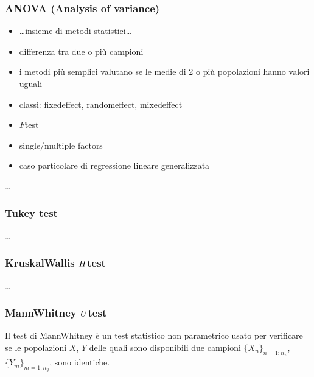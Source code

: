 \documentclass[letterpaper,10pt,italian]{jupyterBook}
\begin{document}
\subsubsection{ANOVA (Analysis of variance)}
\label{\detokenize{ch/statistics/hp-test-independence:anova-analysis-of-variance}}\begin{itemize}
\item {} 
\sphinxAtStartPar
…insieme di metodi statistici…

\item {} 
\sphinxAtStartPar
differenza tra due o più campioni

\item {} 
\sphinxAtStartPar
i metodi più semplici valutano se le medie di 2 o più popolazioni hanno valori uguali

\item {} 
 classi: fixed\sphinxhyphen{}effect, random\sphinxhyphen{}effect, mixed\sphinxhyphen{}effect

\item {} 
\sphinxAtStartPar
\(F\)\sphinxhyphen{}test

\item {} 
\sphinxAtStartPar
single/multiple factors

\item {} 
\sphinxAtStartPar
caso particolare di regressione lineare generalizzata

\end{itemize}

\sphinxAtStartPar
…


\subsubsection{Tukey test}
\label{\detokenize{ch/statistics/hp-test-independence:tukey-test}}
\sphinxAtStartPar
…


\subsubsection{Kruskal\sphinxhyphen{}Wallis \protect\(H\protect\)\sphinxhyphen{}test}
\label{\detokenize{ch/statistics/hp-test-independence:kruskal-wallis-h-test}}
\sphinxAtStartPar
…


\subsubsection{Mann\sphinxhyphen{}Whitney \protect\(U\protect\)\sphinxhyphen{}test}
\label{\detokenize{ch/statistics/hp-test-independence:mann-whitney-u-test}}
\sphinxAtStartPar
Il test di Mann\sphinxhyphen{}Whitney è un test statistico non parametrico usato per verificare se le popolazioni \(X\), \(Y\) delle quali sono disponibili due campioni \(\{X_n\}_{n=1:n_x}\), \(\{Y_m\}_{m=1:n_y}\), sono identiche.
\end{document}
